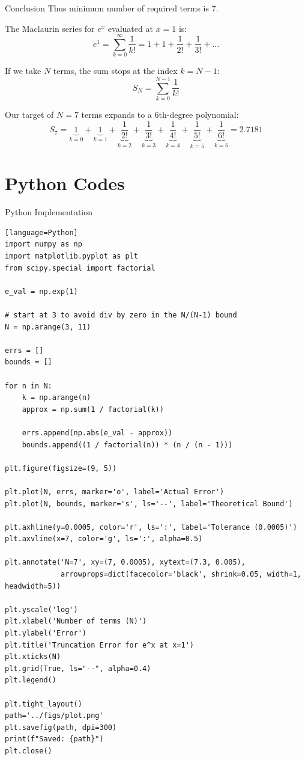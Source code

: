 \documentclass{beamer}
\numberwithin{equation}{section}
\begin{document}
\begin{frame}{Conclusion}
Thus minimum number of required terms is 7.
\vspace{0.3cm}

The Maclaurin series for $e^x$ evaluated at $x = 1$ is:
\begin{equation}
    e^1 = \sum_{k=0}^{\infty} \frac{1}{k!} = 1 + 1 + \frac{1}{2!} + \frac{1}{3!} + \dots
\end{equation}

If we take $N$ terms, the sum stops at the index $k = N-1$:
\begin{equation}
    S_N = \sum_{k=0}^{N-1} \frac{1}{k!}
\end{equation}

Our target of $N=7$ terms expands to a 6th-degree polynomial:
\begin{equation}
    S_7 = \underbrace{1}_{k=0} + \underbrace{1}_{k=1} + \underbrace{\frac{1}{2!}}_{k=2} + \underbrace{\frac{1}{3!}}_{k=3} + \underbrace{\frac{1}{4!}}_{k=4} + \underbrace{\frac{1}{5!}}_{k=5} + \underbrace{\frac{1}{6!}}_{k=6} = 2.7181
\end{equation}
\end{frame}
\section{Python Codes}
\begin{frame}{Python Implementation}
\begin{lstlisting}[basicstyle=\scriptsize\ttfamily][language=Python]
import numpy as np
import matplotlib.pyplot as plt
from scipy.special import factorial

e_val = np.exp(1)

# start at 3 to avoid div by zero in the N/(N-1) bound
N = np.arange(3, 11)

errs = []
bounds = []

for n in N:
    k = np.arange(n)
    approx = np.sum(1 / factorial(k))
    
    errs.append(np.abs(e_val - approx))
    bounds.append((1 / factorial(n)) * (n / (n - 1)))

plt.figure(figsize=(9, 5))

plt.plot(N, errs, marker='o', label='Actual Error')
plt.plot(N, bounds, marker='s', ls='--', label='Theoretical Bound')

plt.axhline(y=0.0005, color='r', ls=':', label='Tolerance (0.0005)')
plt.axvline(x=7, color='g', ls=':', alpha=0.5)

plt.annotate('N=7', xy=(7, 0.0005), xytext=(7.3, 0.005),
             arrowprops=dict(facecolor='black', shrink=0.05, width=1, headwidth=5))

plt.yscale('log')
plt.xlabel('Number of terms (N)')
plt.ylabel('Error')
plt.title('Truncation Error for e^x at x=1')
plt.xticks(N)
plt.grid(True, ls="--", alpha=0.4)
plt.legend()

plt.tight_layout()
path='../figs/plot.png'
plt.savefig(path, dpi=300)
print(f"Saved: {path}")
plt.close()
\end{lstlisting}
\end{frame}
\end{document}
